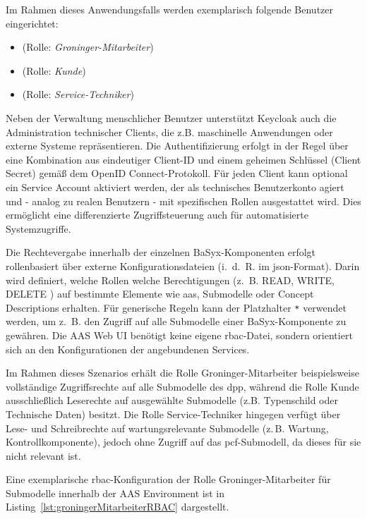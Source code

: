 Im Rahmen dieses Anwendungsfalls werden exemplarisch folgende Benutzer eingerichtet:

\begin{itemize}[noitemsep, leftmargin=*, label=\textbullet]
  \item {} (Rolle: \textit{Groninger-Mitarbeiter})
  \item {} (Rolle: \textit{Kunde})
  \item {} (Rolle: \textit{Service-Techniker})
\end{itemize}

Neben der Verwaltung menschlicher Benutzer unterstützt Keycloak auch die Administration technischer Clients, die z.B. maschinelle Anwendungen oder externe Systeme repräsentieren.  
Die Authentifizierung erfolgt in der Regel über eine Kombination aus eindeutiger Client-ID und einem geheimen Schlüssel (Client Secret) gemäß dem OpenID Connect-Protokoll.  
Für jeden Client kann optional ein Service Account aktiviert werden, der als technisches Benutzerkonto agiert und - analog zu realen Benutzern - mit spezifischen Rollen ausgestattet wird.  
Dies ermöglicht eine differenzierte Zugriffsteuerung auch für automatisierte Systemzugriffe.

Die Rechtevergabe innerhalb der einzelnen BaSyx-Komponenten erfolgt rollenbasiert über externe Konfigurationsdateien (i.~d.~R. im \acs{json}-Format).  
Darin wird definiert, welche Rollen welche Berechtigungen (z.~B. READ, WRITE, DELETE ) auf bestimmte Elemente wie \acs{aas}, Submodelle oder Concept Descriptions erhalten.  
Für generische Regeln kann der Platzhalter \texttt{*} verwendet werden, um z.~B. den Zugriff auf alle Submodelle einer BaSyx-Komponente zu gewähren.  
Die AAS Web UI benötigt keine eigene \acs{rbac}-Datei, sondern orientiert sich an den Konfigurationen der angebundenen Services.

Im Rahmen dieses Szenarios erhält die Rolle Groninger-Mitarbeiter beispielsweise vollständige Zugriffsrechte auf alle Submodelle des \acs{dpp}, während die Rolle Kunde ausschließlich Leserechte auf ausgewählte Submodelle (z.B. Typenschild oder Technische Daten) besitzt.  
Die Rolle Service-Techniker hingegen verfügt über Lese- und Schreibrechte auf wartungsrelevante Submodelle (z.\,B. Wartung, Kontrollkomponente), jedoch ohne Zugriff auf das \acs{pcf}-Submodell, da dieses für sie nicht relevant ist.  

Eine exemplarische \acs{rbac}-Konfiguration der Rolle Groninger-Mitarbeiter für Submodelle innerhalb der AAS Environment ist in Listing~\ref{lst:groningerMitarbeiterRBAC} dargestellt.

